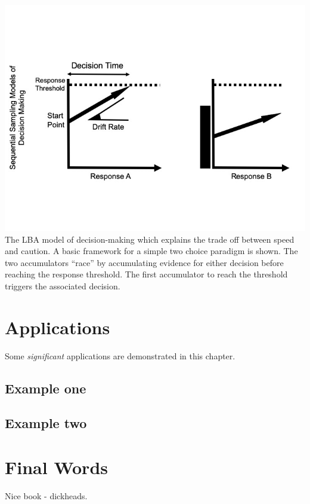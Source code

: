 \documentclass[]{book}
\begin{document}
\includegraphics[width=10in]{_images/LBA} The LBA model of
decision-making which explains the trade off between speed and caution.
A basic framework for a simple two choice paradigm is shown. The two
accumulators ``race'' by accumulating evidence for either decision
before reaching the response threshold. The first accumulator to reach
the threshold triggers the associated decision.

\chapter{Applications}\label{applications}

Some \emph{significant} applications are demonstrated in this chapter.

\section{Example one}\label{example-one}

\section{Example two}\label{example-two}

\chapter{Final Words}\label{final-words}

Nice book - dickheads.


\end{document}
